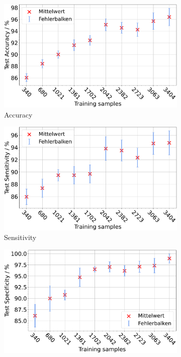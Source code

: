 \begin{figure}[H]
  \centering
  \begin{subfigure}[b]{0.48\textwidth}
    \includegraphics[width=\textwidth]{plots/Augm-Messungen-noTu-Tu_Accuracy_mean.pdf}
    \caption{Accuracy}
    \label{fig:augmentation_accuracy}
  \end{subfigure}
  \begin{subfigure}[b]{0.48\textwidth}
    \includegraphics[width=\textwidth]{plots/Augm-Messungen-noTu-Tu_Sensitivity_mean.pdf}
    \caption{Sensitivity}
    \label{fig:augmentation_sensitivity}
  \end{subfigure}
  \begin{subfigure}[b]{0.48\textwidth}
    \includegraphics[width=\textwidth]{plots/Augm-Messungen-noTu-Tu_Specificity_mean.pdf}

\end{subfigure}
\end{figure}
